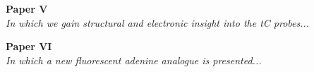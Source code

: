 \cleardoublepage
\begin{titlepage}
    \vspace*{\fill}
    \begin{center}
      {\LARGE \textbf{Paper V}}\\[0.5cm]
      {\Large \textit{In which we gain structural and electronic insight into the tC probes...}}\\[0.4cm]
    \end{center}
    \vspace*{\fill}
  \end{titlepage}
\cleardoublepage



\cleardoublepage
\begin{titlepage}
    \vspace*{\fill}
    \begin{center}
      {\LARGE \textbf{Paper VI}}\\[0.5cm]
      {\Large \textit{In which a new fluorescent adenine analogue is presented...}}\\[0.4cm]
    \end{center}
    \vspace*{\fill}
  \end{titlepage}
\cleardoublepage


